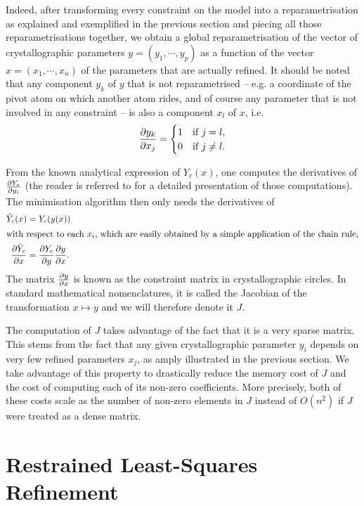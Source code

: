 \documentclass[pdf]{iucr}
\begin{document}
Indeed, after transforming every constraint on the model into a reparametrisation as explained and exemplified in the previous section and piecing all those reparametrisations together, we obtain a global reparametrisation of the vector of crystallographic parameters $y = (y_1, \cdots, y_p)$ as a function of the vector $x=(x_1, \cdots, x_n)$ of the parameters that are actually refined. It should be noted that any component $y_k$ of $y$ that is not reparametrised -- e.g. a coordinate of the pivot atom on which another atom rides, and of course any parameter that is not involved in any constraint --  is also a component $x_l$ of $x$, i.e. 
\begin{equation}
\frac{\partial y_k}{\partial x_j} = \begin{cases} 
   1& \text{if $j=l$},\\
   0& \text{if $j \neq l$}.
   \end{cases}
\end{equation}

 From the known analytical expression of $Y_c(x)$, one computes the derivatives of $\frac{\partial Y_c}{\partial y_i}$ (the reader is referred to  for a detailed presentation of those computations). The minimisation algorithm then only needs the derivatives of
\begin{align}
\tilde{Y}_c(x) &= Y_c(y(x)) \\
 \shortintertext{with respect to each $x_i$, which are easily obtained by a simple application of the chain rule,}
\frac{\partial \tilde{Y}_c}{\partial x} &= \frac{\partial Y_c}{\partial y} \frac{\partial y}{\partial x}.
\label{eqn:chainrule}
\end{align}
The matrix $\frac{\partial y}{\partial x}$ is known as the constraint matrix in crystallographic circles. In standard mathematical nomenclatures, it is called the Jacobian of the transformation $x \mapsto y$ and we will therefore denote it $J$.

The computation of $J$ takes advantage of the fact that it is a very sparse matrix. This stems from the fact that any given crystallographic parameter $y_i$ depends on very few refined parameters $x_j$, as amply illustrated in the previous section. We take advantage of this property to drastically reduce the memory cost of $J$ and the cost of computing each of its non-zero coefficients. More precisely, both of these costs scale as the number of non-zero elements in $J$ instead of $O(n^2)$ if $J$ were treated as a dense matrix.

\section{Restrained Least-Squares Refinement}
\label{sec:restraints}
\end{document}
